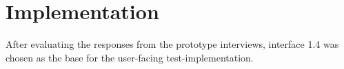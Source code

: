 \documentclass[nofilelist,dvipsnames]{cslthse-msc}
\begin{document}
%
%
%
%

    \section{Implementation}

      After evaluating the responses from the prototype interviews, interface
      1.4 was chosen as the base for the user-facing test-implementation.
\end{document}
